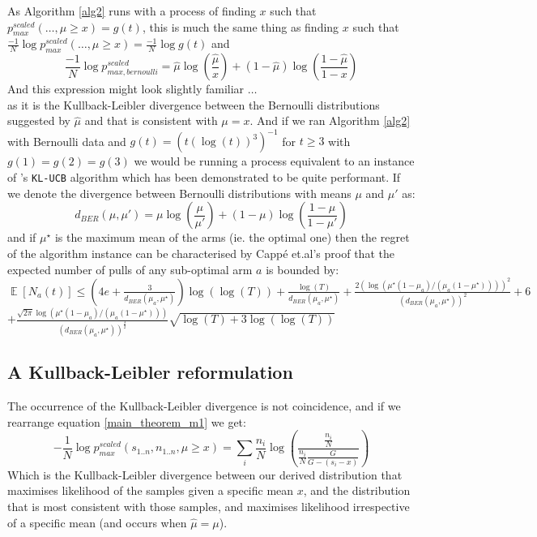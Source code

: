 \documentclass[12pt]{colt2020} %
\DeclareMathOperator{\E}{\mathbb{E}}
\begin{document}
As Algorithm \ref{alg2} runs with a process of finding $x$ such that $p_{max}^{scaled}(\dots,\mu\ge x) = g(t)$, this is much the same thing as finding $x$ such that $\frac{-1}{N}\log p_{max}^{scaled}(\dots,\mu\ge x) = \frac{-1}{N}\log g(t)$ and
$$\frac{-1}{N}\log p_{max,bernoulli}^{scaled} = \hat{\mu}\log\left(\frac{\hat{\mu}}{x}\right) + (1-\hat{\mu})\log\left(\frac{1-\hat{\mu}}{1-x}\right)$$
And this expression might look slightly familiar $\dots$\\ as it is the Kullback-Leibler divergence between the Bernoulli distributions suggested by $\hat{\mu}$ and that is consistent with $\mu=x$.
And if we ran Algorithm \ref{alg2} with Bernoulli data and $g(t) = (t(\log(t))^3)^{-1}$ for $t\ge 3$ with $g(1)=g(2)=g(3)$ we would be running a process equivalent to an instance of \cite{cappe2013}'s \texttt{KL-UCB} algorithm which has been demonstrated to be quite performant.
If we denote the divergence between Bernoulli distributions with means $\mu$ and $\mu'$ as:
$$d_{BER}(\mu,\mu') = \mu\log\left(\frac{\mu}{\mu'}\right) + (1-\mu)\log\left(\frac{1-\mu}{1-\mu'}\right)$$
and if $\mu^\star$ is the maximum mean of the arms (ie. the optimal one) then the regret of the algorithm instance can be characterised by Capp\'{e} et.al's proof that the expected number of pulls of any sub-optimal arm $a$ is bounded by:\\
$ \E[N_a(t)] \le \left(4e + \frac{3}{d_{BER}(\mu_a,\mu^\star)}\right)\log(\log(T)) + \frac{\log(T)}{d_{BER}(\mu_a,\mu^\star)}
 + \frac{2(\log(\mu^\star(1-\mu_a)/(\mu_a(1-\mu^\star))))^2}{(d_{BER}(\mu_a,\mu^\star))^2}
 + 6$\\
\-\hspace{15mm}$ + \frac{\sqrt{2\pi}\log(\mu^\star(1-\mu_a)/(\mu_a(1-\mu^\star)))}{(d_{BER}(\mu_a,\mu^\star))^{\frac{3}{2}}}\sqrt{\log(T)+3\log(\log(T))}$\\

\subsection{A Kullback-Leibler reformulation}\label{sec:KL_section}
The occurrence of the Kullback-Leibler divergence is not coincidence, and if we rearrange equation \ref{main_theorem_m1} we get:
\begin{equation}\label{KL_equation1}-\frac{1}{N}\log p_{max}^{scaled}(s_{1..n},n_{1..n},\mu\ge x) = 
\sum_i\frac{n_i}{N}\log\left(\frac{ \frac{n_i}{N} }{ \frac{n_i}{N}\frac{G}{G-(s_i-x)} }
\right)\end{equation}
Which is the Kullback-Leibler divergence between our derived distribution that maximises likelihood of the samples given a specific mean $x$, and the distribution that is most consistent with those samples, and maximises likelihood irrespective of a specific mean (and occurs when $\hat{\mu}=\mu$).
\end{document}
